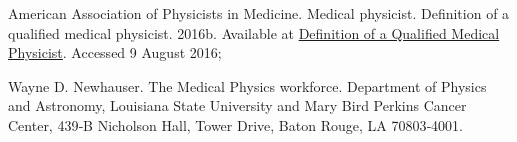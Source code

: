 \begin{thebibliography}{99}
American Association of Physicists in Medicine. Medical physicist. Definition of a qualified medical physicist. 2016b. Available at \href{https://w3.aapm.org/medical_physicist/fields.php}{Definition of a Qualified Medical Physicist}. Accessed 9 August 2016;

Wayne D. Newhauser. The Medical Physics workforce. Department of Physics and Astronomy, Louisiana State University and Mary Bird Perkins Cancer Center, 439‐B Nicholson Hall, Tower Drive, Baton Rouge, LA 70803‐4001.

 

\end{thebibliography}

